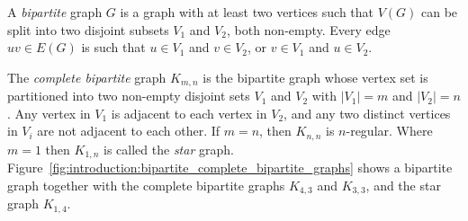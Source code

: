 A \emph{bipartite} graph $G$ is a graph with at least two
vertices such that $V(G)$ can be split into two disjoint subsets $V_1$
and $V_2$, both non-empty. Every edge $uv \in E(G)$ is such that
$u \in V_1$ and $v \in V_2$, or $v \in V_1$ and $u \in V_2$.

The \emph{complete bipartite} graph $K_{m,n}$ is the bipartite graph
whose vertex set is partitioned into two non-empty disjoint sets $V_1$
and $V_2$ with $|V_1| = m$ and $|V_2| = n$. Any vertex in $V_1$ is
adjacent to each vertex in $V_2$, and any two distinct vertices in
$V_i$ are not adjacent to each other. If $m = n$, then $K_{n,n}$ is
$n$-regular. Where $m = 1$ then $K_{1,n}$ is called the \emph{star}
graph. Figure~\ref{fig:introduction:bipartite_complete_bipartite_graphs}
shows a bipartite graph together with the complete bipartite graphs
$K_{4,3}$ and $K_{3,3}$, and the star graph $K_{1,4}$.

